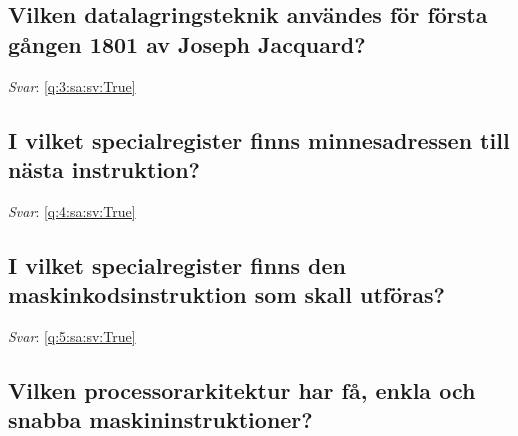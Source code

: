 \documentclass[a4paper,11pt,oneside]{article}
\begin{document}
\begin{sloppypar}
\subsection{Vilken datalagringsteknik anv\"andes f\"or f\"orsta g\r{a}ngen 1801 av Joseph Jacquard?}

\label{q:3:sa:sv:False}

\vspace{2cm}

\noindent\makebox[\textwidth]{\hrulefill}

\vspace{1cm}

\textit{Svar}: \autoref{q:3:sa:sv:True}



\subsection{I vilket specialregister finns minnesadressen till n\"asta instruktion?}

\label{q:4:sa:sv:False}

\vspace{2cm}

\noindent\makebox[\textwidth]{\hrulefill}

\vspace{1cm}

\textit{Svar}: \autoref{q:4:sa:sv:True}



\subsection{I vilket specialregister finns den maskinkodsinstruktion som skall utf\"oras?}

\label{q:5:sa:sv:False}

\vspace{2cm}

\noindent\makebox[\textwidth]{\hrulefill}

\vspace{1cm}

\textit{Svar}: \autoref{q:5:sa:sv:True}



\subsection{Vilken processorarkitektur har f\r{a}, enkla och snabba maskininstruktioner?}

\label{q:6:sa:sv:False}


\end{sloppypar}
\end{document}

